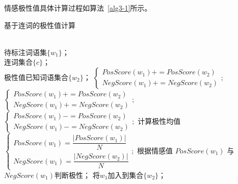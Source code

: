 情感极性值具体计算过程如算法~\ref{alg3-1}所示。
\begin{algorithm}[htp]
\caption{基于连词的极性值计算}
\label{alg3-1}
\begin{algorithmic}[1]
\REQUIRE ~~\\
待标注词语集$\{w_1\}$；\\
连词集合$\{c\}$；\\
极性值已知词语集合$\{w_2\}$；
\STATE $
\begin{cases}
PosScore(w_1)+=PosScore(w_2)\\
NegScore(w_1)+=NegScore(w_2)
\end{cases};$
\ELSE
{}
\STATE $
\begin{cases}
PosScore(w_1)+=PosScore(w_2)\\
NegScore(w_1)+=NegScore(w_2)
\end{cases};$
\ENDIF
{}
\STATE $
\begin{cases}
PosScore(w_1)-=PosScore(w_2)\\
NegScore(w_1)-=NegScore(w_2)
\end{cases};$
\ENDIF
\ENDIF
\ENDFOR
\STATE 计算极性均值$
\begin{cases}
PosScore(w_1)=\dfrac{|PosScore(w_1)|}{N}\\
NegScore(w_1)=\dfrac{|NegScore(w_2)|}{N}
\end{cases};$
\STATE 根据情感值 $PosScore(w_1)$ 与$ NegScore(w_1) $判断极性；
\STATE 将$ w_1 $加入到集合$ \{w_2\} $；
\ENDFOR
\end{algorithmic}
\end{algorithm}

